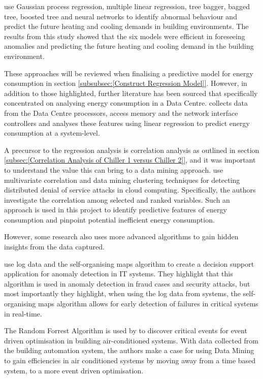 \documentclass[12pt]{scrartcl}
\begin{document}
\citet{AHMAD2018460} use Gaussian process regression, multiple linear regression, tree bagger, bagged tree, boosted tree and neural networks to identify abnormal behaviour and predict the future heating and cooling demands in building environments. The results from this study showed that the six models were efficient in foreseeing anomalies and predicting the future heating and cooling demand in the building environment.  

These approaches will be reviewed when finalising a predictive model for energy consumption in section \ref{subsubsec:[Construct Regression Model]}. However, in addition to those highlighted, further literature has been sourced that specifically concentrated on analysing energy consumption in a Data Centre. \citet{Makris2017} collects data from the Data Centre processors, access memory and the network interface controllers and analyses these features using linear regression to predict energy consumption at a system-level.

A precursor to the regression analysis is correlation analysis as outlined in section \ref{subsec:[Correlation Analysis of Chiller 1 versus Chiller 2]}, and it was important to understand the value this can bring to a data mining approach. \citet{13375977120180401} use multivariate correlation and data mining clustering techniques for detecting distributed denial of service attacks in cloud computing. Specifically, the authors investigate the correlation among selected and ranked variables. Such an approach is used in this project to identify predictive features of energy consumption and pinpoint potential inefficient energy consumption.    

However, some research also uses more advanced algorithms to gain hidden insights from the data captured. 

\citet{13090171620180801} use log data and the self-organising maps algorithm to create a decision support application for anomaly detection in IT systems. They highlight that this algorithm is used in anomaly detection in fraud cases and security attacks, but most importantly they highlight, when using the log data from systems, the self-organising maps algorithm allows for early detection of failures in critical systems in real-time. 

The Random Forrest Algorithm is used by \citet{WANG2017251} to discover critical events for event driven optimisation in building air-conditioned systems. With data collected from the building automation system, the authors make a case for using Data Mining to gain efficiencies in air conditioned systems by moving away from a time based system, to a more event driven optimisation.  
\end{document}
